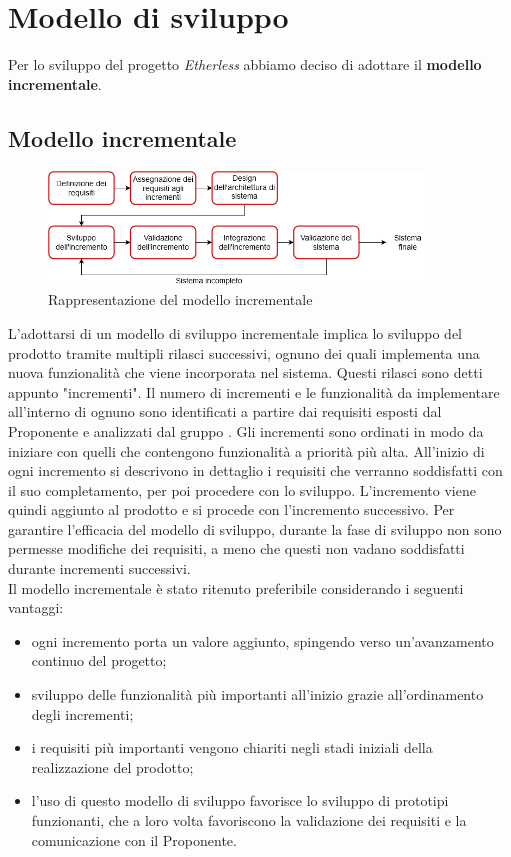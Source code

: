 \section{Modello di sviluppo}
Per lo sviluppo del progetto \textit{Etherless} abbiamo deciso di adottare il \textbf{modello incrementale}.
  \subsection{Modello incrementale}
    \begin{figure}[h!]
      \centering
      \includegraphics[width=0.9\textwidth]{./res/img/modello_incr.png}
      \caption{Rappresentazione del modello incrementale}
    \end{figure}
    L'adottarsi di un modello di sviluppo incrementale implica lo sviluppo del prodotto tramite multipli rilasci successivi, ognuno dei quali implementa una nuova funzionalità che viene incorporata nel sistema. Questi rilasci sono detti appunto "incrementi". Il numero di incrementi e le funzionalità da implementare all'interno di ognuno sono identificati a partire dai requisiti esposti dal Proponente e analizzati dal gruppo \Gruppo{}. Gli incrementi sono ordinati in modo da iniziare con quelli che contengono funzionalità a priorità più alta. All'inizio di ogni incremento si descrivono in dettaglio i requisiti che verranno soddisfatti con il suo completamento, per poi procedere con lo sviluppo. L'incremento viene quindi aggiunto al prodotto e si procede con l'incremento successivo. Per garantire l'efficacia del modello di sviluppo, durante la fase di sviluppo non sono permesse modifiche dei requisiti, a meno che questi non vadano soddisfatti durante incrementi successivi.\\
    Il modello incrementale è stato ritenuto preferibile considerando i seguenti vantaggi:
    \begin{itemize}
      \item ogni incremento porta un valore aggiunto, spingendo verso un'avanzamento continuo del progetto;
      \item sviluppo delle funzionalità più importanti all'inizio grazie all'ordinamento degli incrementi;
      \item i requisiti più importanti vengono chiariti negli stadi iniziali della realizzazione del prodotto;
      \item l'uso di questo modello di sviluppo favorisce lo sviluppo di prototipi funzionanti, che a loro volta favoriscono la validazione dei requisiti e la comunicazione con il Proponente.
    \end{itemize}
